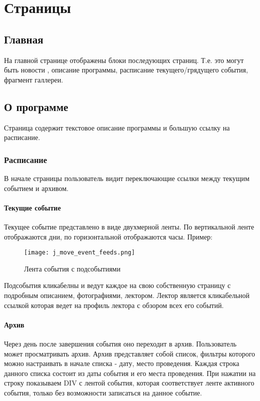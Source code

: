\documentclass[DIV=calc, paper=a4, fontsize=11pt]{scrartcl} %
\begin{document}
\section{Страницы}

\subsection{Главная}

На главной странице отображены блоки последующих страниц. Т.е. это могут быть новости , описание программы, расписание текущего/грядущего события, фрагмент галлереи.

\subsection{О программе}
Страница содержит текстовое описание программы и большую ссылку на расписание.
\subsubsection{Расписание}
В начале страницы пользователь видит переключающие ссылки между текущим событием и архивом.

\paragraph{Текущие событие}
Текущее событие представлено в виде двухмерной ленты. По вертикальной ленте отображаются дни, по горизонтальной отображаются часы. Пример:
        \begin{figure}[H]
        \centering
        \texttt{[image: j\_move\_event\_feeds.png]}
        \caption{Лента события с подсобытиями\label{fig:j_move_event_feeds.png}}
        \end{figure}

Подсобытия кликабелны и ведут каждое на свою собственную страницу с подробным описанием, фотографиями, лектором. Лектор является кликабельной ссылкой которая ведет на профиль лектора с обзором всех его событий.
        
\paragraph{Архив \label{archive}} 
Через день после завершения события оно переходит в архив. Пользователь может просматривать архив. Архив представляет собой список, фильтры которого можно настраивать в начале списка - дату, место проведения. Каждая строка данного списка состоит из даты события и его места проведения. При нажатии на строку показываем DIV с лентой события, которая соответствует ленте активного события, только без возможности записаться на данное событие.
\end{document}
